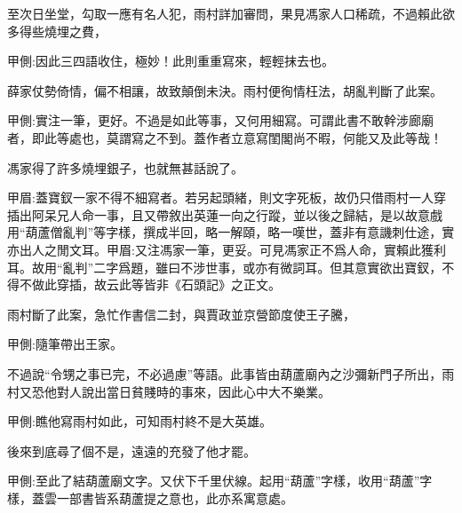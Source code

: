 \begin{parag}
    至次日坐堂，勾取一應有名人犯，雨村詳加審問，果見馮家人口稀疏，不過賴此欲多得些燒埋之費，\begin{note}甲側:因此三四語收住，極妙！此則重重寫來，輕輕抹去也。\end{note}薛家仗勢倚情，偏不相讓，故致顛倒未決。雨村便徇情枉法，胡亂判斷了此案。\begin{note}甲側:實注一筆，更好。不過是如此等事，又何用細寫。可謂此書不敢幹涉廊廟者，即此等處也，莫謂寫之不到。蓋作者立意寫閨閣尚不暇，何能又及此等哉！\end{note}馮家得了許多燒埋銀子，也就無甚話說了。\begin{note}甲眉:蓋寶釵一家不得不細寫者。若另起頭緒，則文字死板，故仍只借雨村一人穿插出阿呆兄人命一事，且又帶敘出英蓮一向之行蹤，並以後之歸結，是以故意戲用“葫蘆僧亂判”等字樣，撰成半回，略一解頤，略一嘆世，蓋非有意譏刺仕途，實亦出人之閒文耳。甲眉:又注馮家一筆，更妥。可見馮家正不爲人命，實賴此獲利耳。故用“亂判”二字爲題，雖曰不涉世事，或亦有微詞耳。但其意實欲出寶釵，不得不做此穿插，故云此等皆非《石頭記》之正文。\end{note}雨村斷了此案，急忙作書信二封，與賈政並京營節度使王子騰，\begin{note}甲側:隨筆帶出王家。\end{note}不過說“令甥之事已完，不必過慮”等語。此事皆由葫蘆廟內之沙彌新門子所出，雨村又恐他對人說出當日貧賤時的事來，因此心中大不樂業。\begin{note}甲側:瞧他寫雨村如此，可知雨村終不是大英雄。\end{note}後來到底尋了個不是，遠遠的充發了他才罷。\begin{note}甲側:至此了結葫蘆廟文字。又伏下千里伏線。起用“葫蘆”字樣，收用“葫蘆”字樣，蓋雲一部書皆系葫蘆提之意也，此亦系寓意處。\end{note}
\end{parag}


